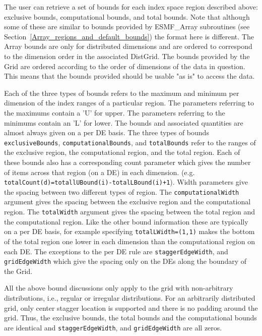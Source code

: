    The user can retrieve a set of bounds for each index space region
   described above: exclusive bounds, computational bounds,
   and total bounds. Note that although some of these are similar
   to bounds provided by ESMF\_Array subroutines
   (see Section~\ref{Array_regions_and_default_bounds})
   the format here is different. The Array bounds are only for
   distributed dimensions and are ordered to correspond
   to the dimension order in the associated DistGrid. The bounds
   provided by the Grid are ordered according to the order of dimensions of the data
   in question. This means that the bounds provided should be usable
   "as is" to access the data.
  
   Each of the three types of bounds refers to the maximum and minimum
   per dimension of the index ranges of a particular region. The parameters
   referring to the maximums contain a 'U' for upper. The parameters referring
   to the minimums contain an 'L' for lower. The bounds and associated
   quantities are almost always given on a per DE basis. The three types of
   bounds {\tt exclusiveBounds}, {\tt computationalBounds}, and {\tt totalBounds} refer
   to the ranges of the exclusive region, the computational region, and the
   total region. Each of these bounds also has a corresponding count parameter
   which gives the number of items across that region (on a DE) in each dimension.
   (e.g. {\tt totalCount(d)=totallUBound(i)-totalLBound(i)+1}). Width parameters
   give the spacing between two different types of region. The
   {\tt computationalWidth} argument gives the spacing between the exclusive
   region and the computational region. The {\tt totalWidth} argument gives the
   spacing between the total region and the computational region. Like the
   other bound information these are typically on a per DE basis, for example
   specifying {\tt totalLWidth=(1,1)} makes the bottom of the total
   region one lower in each dimension than the computational region on
   each DE. The exceptions to the per DE rule are
   {\tt staggerEdgeWidth}, and {\tt gridEdgeWidth}
   which give the spacing only on the DEs along the boundary of the Grid.
  
   All the above bound discussions only apply to the grid with non-arbitrary distributions,
   i.e., regular or irregular distributions.  For an arbitrarily distributed grid,
   only center stagger location is supported and there is no padding around the grid.
   Thus, the exclusive bounds, the total bounds and the computational bounds are identical
   and {\tt staggerEdgeWidth}, and {\tt gridEdgeWidth} are all zeros. 

